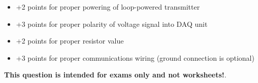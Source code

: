\begin{itemize}
\item{} +2 points for proper powering of loop-powered transmitter
\item{} +3 points for proper polarity of voltage signal into DAQ unit
\item{} +2 points for proper resistor value
\item{} +3 points for proper communications wiring (ground connection is optional)
\end{itemize}







{\bf This question is intended for exams only and not worksheets!}.



